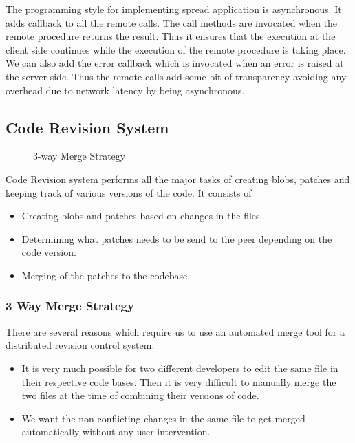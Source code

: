 \documentclass[12pt]{article}
\begin{document}
The programming style for implementing spread application is asynchronous. It
adds callback to all the remote calls. The call methods are invocated when the
remote procedure returns the result. Thus it ensures that the execution at the
client side continues while the execution of the remote procedure is taking
place. We can also add the error callback which is invocated when an error is
raised at the server side. Thus the remote calls add some bit of transparency
avoiding any overhead due to network latency by being asynchronous.

\subsection{Code Revision System}
\begin{wrapfigure}[8]{r}{9cm}
\centering
{}
\caption{3-way Merge Strategy}
\end{wrapfigure}
Code Revision system performs all the major tasks of creating blobs, patches and
keeping track of various versions of the code. It consists of
\begin{itemize}
\item Creating blobs and patches based on changes in the files.
\item Determining what patches needs to be send to the peer depending on the
  code version.
\item Merging of the patches to the codebase.
\end{itemize}
\subsubsection{3 Way  Merge Strategy}
There are several reasons which require us to use an automated merge tool for a distributed revision control system:
\begin{itemize}
\item It is very much possible for two different developers to edit the same file in their respective code bases. Then it is very difficult to manually merge the two files at the time of combining their versions of code.
\item We want the non-conflicting changes in the same file to get merged automatically without any user intervention.
\end{itemize}
\end{document}
